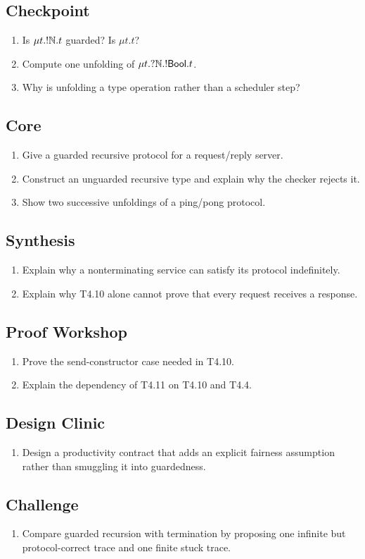 \subsection*{Checkpoint}
\begin{enumerate}[label=\textbf{7.\arabic*},start=1]
\item Is $\mu t.!\mathbb{N}.t$ guarded? Is $\mu t.t$?
\item Compute one unfolding of $\mu t.?\mathbb{N}.!\mathsf{Bool}.t$.
\item Why is unfolding a type operation rather than a scheduler step?
\end{enumerate}
\subsection*{Core}
\begin{enumerate}[label=\textbf{7.\arabic*},start=4]
\item Give a guarded recursive protocol for a request/reply server.
\item Construct an unguarded recursive type and explain why the checker rejects it.
\item Show two successive unfoldings of a ping/pong protocol.
\end{enumerate}
\subsection*{Synthesis}
\begin{enumerate}[label=\textbf{7.\arabic*},start=7]
\item Explain why a nonterminating service can satisfy its protocol indefinitely.
\item Explain why T4.10 alone cannot prove that every request receives a response.
\end{enumerate}
\subsection*{Proof Workshop}
\begin{enumerate}[label=\textbf{7.\arabic*},start=9]
\item Prove the send-constructor case needed in T4.10.
\item Explain the dependency of T4.11 on T4.10 and T4.4.
\end{enumerate}
\subsection*{Design Clinic}
\begin{enumerate}[label=\textbf{7.\arabic*},start=11]
\item Design a productivity contract that adds an explicit fairness assumption rather than smuggling it into guardedness.
\end{enumerate}
\subsection*{Challenge}
\begin{enumerate}[label=\textbf{7.\arabic*},start=12]
\item Compare guarded recursion with termination by proposing one infinite but protocol-correct trace and one finite stuck trace.
\end{enumerate}
